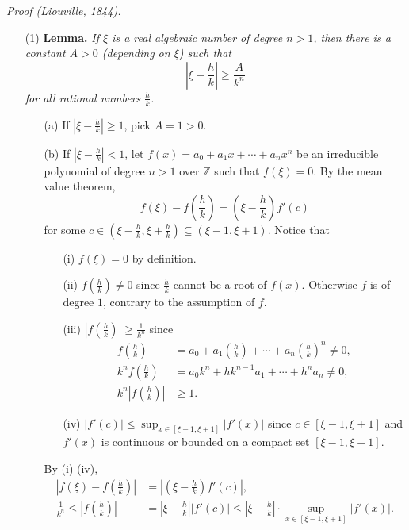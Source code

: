 \documentclass{article}
\begin{document}
\emph{Proof (Liouville, 1844).}
\begin{enumerate}
\item[(1)]
\textbf{Lemma.}
\emph{If $\xi$ is a real algebraic number of degree $n > 1$,
then there is a constant $A > 0$ (depending on $\xi$) such that
$$\left| \xi - \frac{h}{k} \right| \geq \frac{A}{k^n}$$
for all rational numbers $\frac{h}{k}$.}
\begin{enumerate}
\item[(a)]
If $\left| \xi - \frac{h}{k} \right| \geq 1$, pick $A = 1 > 0$.
\item[(b)]
If $\left| \xi - \frac{h}{k} \right| < 1$,
let $f(x) = a_0 + a_1 x + \cdots + a_n x^n$
be an irreducible polynomial of degree $n > 1$ over $\mathbb{Z}$ such that
$f(\xi) = 0$.
By the mean value theorem,
$$f(\xi) - f\left( \frac{h}{k} \right)
= \left( \xi - \frac{h}{k} \right) f'(c)$$
for some
$c
\in \left( \xi - \frac{h}{k}, \xi + \frac{h}{k} \right)
\subseteq (\xi - 1, \xi + 1)$.
Notice that
\begin{enumerate}
\item[(i)]
$f(\xi) = 0$ by definition.
\item[(ii)]
$f\left( \frac{h}{k} \right) \neq 0$ since $\frac{h}{k}$ cannot be a root of $f(x)$.
Otherwise $f$ is of degree $1$, contrary to the assumption of $f$.
\item[(iii)]
$\left| f\left( \frac{h}{k} \right) \right| \geq \frac{1}{k^n}$
since
\begin{align*}
  f\left( \frac{h}{k} \right)
  &= a_0 + a_1 \left( \frac{h}{k} \right) + \cdots + a_n \left( \frac{h}{k} \right)^n
  \neq 0, \\
  k^n f\left( \frac{h}{k} \right)
  &= a_0 k^n + h k^{n-1} a_1 + \cdots + h^n a_n
  \neq 0, \\
  k^n \left| f\left( \frac{h}{k} \right) \right|
  &\geq 1.
\end{align*}
\item[(iv)]
$|f'(c)| \leq \sup_{x \in [\xi - 1, \xi + 1]}|f'(x)|$ since
$c \in [\xi - 1, \xi + 1]$
and $f'(x)$ is continuous or bounded on a compact set $[\xi - 1, \xi + 1]$.
\end{enumerate}
By (i)-(iv),
\begin{align*}
  \left| f(\xi) - f\left( \frac{h}{k} \right) \right|
  &= \left| \left( \xi - \frac{h}{k} \right) f'(c) \right|, \\
  \frac{1}{k^n} \leq \left| f\left( \frac{h}{k} \right) \right|
  &= \left| \xi - \frac{h}{k} \right| |f'(c)|
  \leq \left| \xi - \frac{h}{k} \right| \cdot \sup_{x \in [\xi - 1, \xi + 1]}|f'(x)|.

\end{align*}
\end{enumerate}
\end{enumerate}
\end{document}
